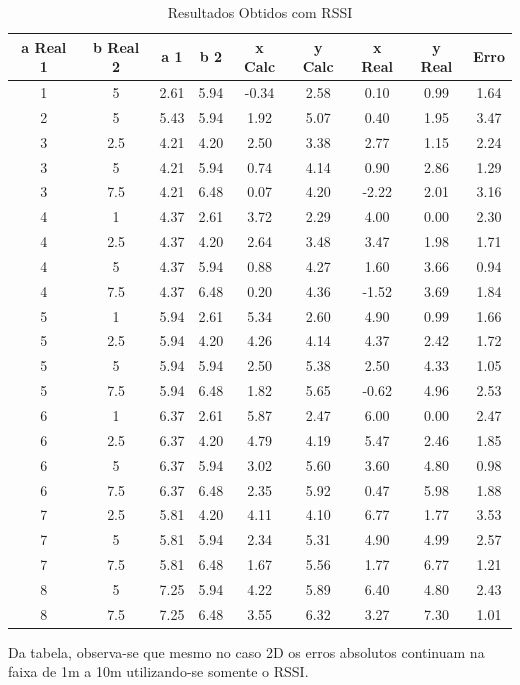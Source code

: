 \begin{table}[t]
    \centering
    \begin{tabular}{||c c c c c c c c c||} 
    \hline
    a Real 1 & b Real 2 & a 1 & b 2 & x Calc & y Calc	& x Real & y Real & Erro\\ [0.5ex] 
    \hline\hline
    1 & 5 & 2.61 & 5.94 & -0.34 & 2.58 & 0.10 & 0.99 & 1.64\\ 
    \hline
    2 & 5 & 5.43 & 5.94 & 1.92 & 5.07 & 0.40 & 1.95 & 3.47\\ 
    \hline
    3 & 2.5 & 4.21 & 4.20 & 2.50 & 3.38 & 2.77 & 1.15 & 2.24\\ 
    \hline
    3 & 5 & 4.21 & 5.94 & 0.74 & 4.14 & 0.90 & 2.86 & 1.29\\ 
    \hline
    3 & 7.5 & 4.21 & 6.48 & 0.07 & 4.20 & -2.22 & 2.01 & 3.16\\ 
    \hline
    4 & 1 & 4.37 & 2.61 & 3.72 & 2.29 & 4.00 & 0.00 & 2.30\\ 
    \hline
    4 & 2.5 & 4.37 & 4.20 & 2.64 & 3.48 & 3.47 & 1.98 & 1.71\\ 
    \hline
    4 & 5 & 4.37 & 5.94 & 0.88 & 4.27 & 1.60 & 3.66 & 0.94\\ 
    \hline
    4 & 7.5 & 4.37 & 6.48 & 0.20 & 4.36 & -1.52 & 3.69 & 1.84\\ 
    \hline
    5 & 1 & 5.94 & 2.61 & 5.34 & 2.60 & 4.90 & 0.99 & 1.66\\ 
    \hline
    5 & 2.5 & 5.94 & 4.20 & 4.26 & 4.14 & 4.37 & 2.42 & 1.72\\ 
    \hline
    5 & 5 & 5.94 & 5.94 & 2.50 & 5.38 & 2.50 & 4.33 & 1.05\\ 
    \hline
    5 & 7.5 & 5.94 & 6.48 & 1.82 & 5.65 & -0.62 & 4.96 & 2.53\\ 
    \hline
    6 & 1 & 6.37 & 2.61 & 5.87 & 2.47 & 6.00 & 0.00 & 2.47\\ 
    \hline
    6 & 2.5 & 6.37 & 4.20 & 4.79 & 4.19 & 5.47 & 2.46 & 1.85\\ 
    \hline
    6 & 5 & 6.37 & 5.94 & 3.02 & 5.60 & 3.60 & 4.80 & 0.98\\ 
    \hline
    6 & 7.5 & 6.37 & 6.48 & 2.35 & 5.92 & 0.47 & 5.98 & 1.88\\ 
    \hline
    7 & 2.5 & 5.81 & 4.20 & 4.11 & 4.10 & 6.77 & 1.77 & 3.53\\ 
    \hline
    7 & 5 & 5.81 & 5.94 & 2.34 & 5.31 & 4.90 & 4.99 & 2.57\\ 
    \hline
    7 & 7.5 & 5.81 & 6.48 & 1.67 & 5.56 & 1.77 & 6.77 & 1.21\\ 
    \hline
    8 & 5 & 7.25 & 5.94 & 4.22 & 5.89 & 6.40 & 4.80 & 2.43\\ 
    \hline
    8 & 7.5 & 7.25 & 6.48 & 3.55 & 6.32 & 3.27 & 7.30 & 1.01\\ [0.5ex] 
    \hline
   \end{tabular}
   \caption{Resultados Obtidos com RSSI}
   \label{tab: Resultados Obtidos com RSSI}
\end{table}

   Da tabela, observa-se que mesmo no caso 2D os erros absolutos continuam na faixa de 1m a 10m utilizando-se somente o RSSI.